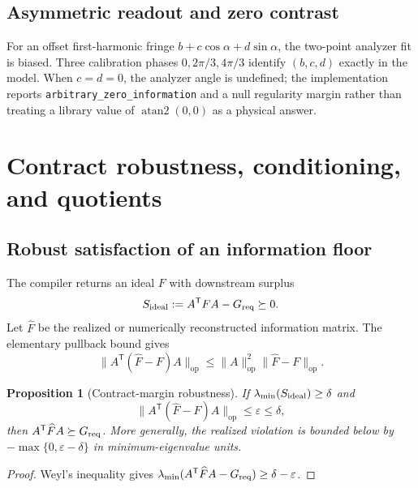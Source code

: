 \documentclass[11pt]{article}
\newtheorem{proposition}[proposition]{Proposition}
\theoremstyle{definition}
\theoremstyle{remark}
\newcommand{\op}{\mathrm{op}}
\newcommand{\eps}{\varepsilon}
\begin{document}
\subsection{Asymmetric readout and zero contrast}
For an offset first-harmonic fringe $b+c\cos\alpha+d\sin\alpha$, the two-point analyzer fit is biased. Three calibration phases $0,2\pi/3,4\pi/3$ identify $(b,c,d)$ exactly in the model. When $c=d=0$, the analyzer angle is undefined; the implementation reports \texttt{arbitrary\_zero\_information} and a null regularity margin rather than treating a library value of $\operatorname{atan2}(0,0)$ as a physical answer.

\section{Contract robustness, conditioning, and quotients}

\subsection{Robust satisfaction of an information floor}
The compiler returns an ideal $F$ with downstream surplus
\begin{equation}
  S_{\rm ideal}:=A^{\mathsf T}FA-G_{\rm req}\succeq0.
\end{equation}
Let $\widehat F$ be the realized or numerically reconstructed information matrix. The elementary pullback bound gives
\begin{equation}
  \|A^{\mathsf T}(\widehat F-F)A\|_{\op}
  \le\|A\|_{\op}^2\|\widehat F-F\|_{\op}.
  \label{eq:elementary-pullback-bound}
\end{equation}

\begin{proposition}[Contract-margin robustness]
\label{prop:contract-margin}
If $\lambda_{\min}(S_{\rm ideal})\ge\delta$ and
\begin{equation}
  \|A^{\mathsf T}(\widehat F-F)A\|_{\op}\le\eps\le\delta,
\end{equation}
then $A^{\mathsf T}\widehat F A\succeq G_{\rm req}$. More generally, the realized violation is bounded below by $-\max\{0,\eps-\delta\}$ in minimum-eigenvalue units.
\end{proposition}

\begin{proof}
Weyl's inequality gives
$\lambda_{\min}(A^{\mathsf T}\widehat F A-G_{\rm req})\ge\delta-\eps$.
\end{proof}
\end{document}
